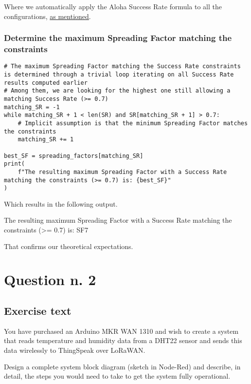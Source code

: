 \documentclass[a4paper,11pt]{article} %
\begin{document}
    Where we automatically apply the Aloha Success Rate formula to all the configurations, \hyperref[subsec:resolution]{as mentioned}.

    \subsubsection{Determine the maximum Spreading Factor matching the constraints}

    \begin{verbatim}
# The maximum Spreading Factor matching the Success Rate constraints is determined through a trivial loop iterating on all Success Rate results computed earlier
# Among them, we are looking for the highest one still allowing a matching Success Rate (>= 0.7)
matching_SR = -1
while matching_SR + 1 < len(SR) and SR[matching_SR + 1] > 0.7:
    # Implicit assumption is that the minimum Spreading Factor matches the constraints
    matching_SR += 1

best_SF = spreading_factors[matching_SR]
print(
    f"The resulting maximum Spreading Factor with a Success Rate matching the constraints (>= 0.7) is: {best_SF}"
)
    \end{verbatim}

    Which results in the following output.

    \begin{tcolorbox}
        The resulting maximum Spreading Factor with a Success Rate matching the constraints (>= 0.7) is: SF7
    \end{tcolorbox}

    That confirms our theoretical expectations.


    \section{Question n. 2}\label{sec:question-n.-2}

    \subsection{Exercise text}\label{subsec:exercise-text2}

    You have purchased an Arduino MKR WAN 1310 and wish to create a system that reads temperature and humidity data from a DHT22 sensor and sends this data wirelessly to ThingSpeak over LoRaWAN.

    \smallskip

    Design a complete system block diagram (sketch in Node-Red) and describe, in detail, the steps you would need to take to get the system fully operational.
\end{document}
